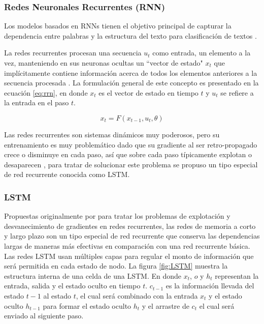 



\subsubsection{Redes Neuronales Recurrentes (RNN)}
Los modelos basados en RNNs tienen el objetivo principal de capturar la dependencia entre palabras y la estructura del texto para clasificación de textos \cite{goodfellow2016deep}.

La redes recurrentes procesan una secuencia $u_t$ como entrada, un elemento a la vez, manteniendo en sus neuronas ocultas un  ``vector de estado" $x_t$ que implícitamente contiene información acerca de todos los elementos anteriores a la secuencia procesada \cite{lecun2015deep}. La formulación general de este concepto es presentado en la ecuación \ref{eq:rrn}, en donde $x_t$ es el vector de estado en tiempo $t$ y $u_t$ se refiere a la entrada en el paso $t$.


\begin{equation} \label{eq:rrn}
    x_t = F(x_{t-1}, u_t, \theta )
\end{equation}


Las redes recurrentes son sistemas dinámicos muy poderosos, pero su entrenamiento es muy problemático dado que su gradiente al ser retro-propagado crece o disminuye en cada paso, así que sobre cada paso típicamente explotan o desaparecen \citep{lecun2015deep}, para tratar de solucionar este problema se propuso un tipo especial de red recurrente conocida como LSTM.

\subsubsection{LSTM}
Propuestas originalmente por \citep{hochreiter1997long} para tratar los problemas de explotación y desvanecimiento de gradientes en redes recurrentes, las redes de memoria a corto y largo plazo son un tipo especial de red recurrente que conserva las dependencias largas de maneras más efectivas en comparación con una red recurrente básica. Las redes LSTM usan múltiples capas para regular el monto de información que será permitida en cada estado de nodo. La figura \ref{fig:LSTM} muestra la estructura interna de una celda de una LSTM. En donde $x_t$, $o$ y $h_t$ representan la entrada, salida y el estado oculto en tiempo $t$. $c_{t-1}$ es la información llevada del estado $t-1$ al estado $t$, el cual será combinado con la entrada $x_t$ y el estado oculto $h_{t-1}$ para formar el estado oculto $h_t$ y el arrastre de $c_t$ el cual será enviado al siguiente paso.


